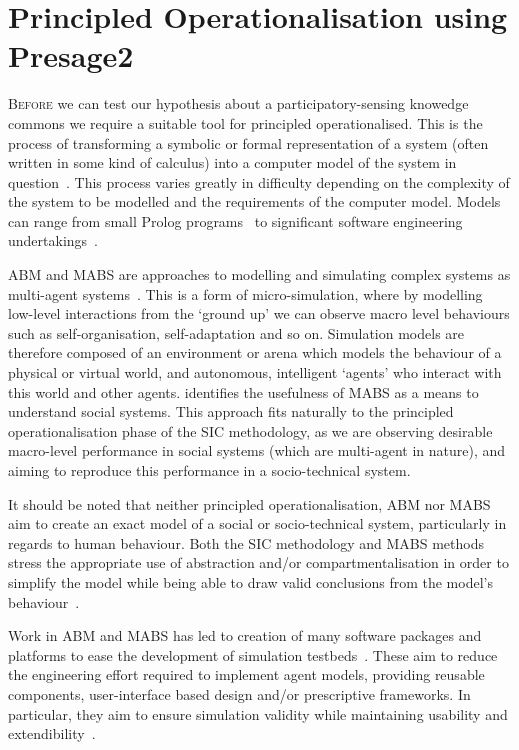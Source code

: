 \acresetall
\chapter{Principled Operationalisation using Presage2}\label{ch:presage}

\lettrine[lines=3]{B}{efore} we can test our hypothesis about a participatory-sensing knowedge commons we require a suitable tool for principled operationalised.
This is the process of transforming a symbolic or formal representation of a system (often written in some kind of calculus) into a computer model of the system in question~\citep{Jones2013}. This process varies greatly in difficulty depending on the complexity of the system to be modelled and the requirements of the computer model. Models can range from small Prolog programs~\citep{Pitt2005a} to significant software engineering undertakings~\citep{Timm2005}.

\ac{ABM} and \ac{MABS} are approaches to modelling and simulating complex systems as multi-agent systems~\citep{Macal2010,Moss2001}.
This is a form of micro-simulation, where by modelling low-level interactions from the `ground up' we can observe macro level behaviours such as self-organisation, self-adaptation and so on.
Simulation models are therefore composed of an environment or arena which models the behaviour of a physical or virtual world, and autonomous, intelligent `agents' who interact with this world and other agents. 
\citet{Axelrod1997} identifies the usefulness of \ac{MABS} as a means to understand social systems. 
This approach fits naturally to the principled operationalisation phase of the \ac{SIC} methodology, as we are observing desirable macro-level performance in social systems (which are multi-agent in nature), and aiming to reproduce this performance in a socio-technical system. 

It should be noted that neither principled operationalisation, \ac{ABM} nor \ac{MABS} aim to create an exact model of a social or socio-technical system, particularly in regards to human behaviour. Both the \ac{SIC} methodology and \ac{MABS} methods stress the appropriate use of abstraction and/or compartmentalisation in order to simplify the model while being able to draw valid conclusions from the model's behaviour~\citep{Edmonds2001}.

Work in \ac{ABM} and \ac{MABS} has led to creation of many software packages and platforms to ease the development of simulation testbeds~\citep{CynthiaNikolaiandGregoryMadey2009}. These aim to reduce the engineering effort required to implement agent models, providing reusable components, user-interface based design and/or prescriptive frameworks. In particular, they aim to ensure simulation validity while maintaining usability and extendibility~\citep{Axelrod1997}.


